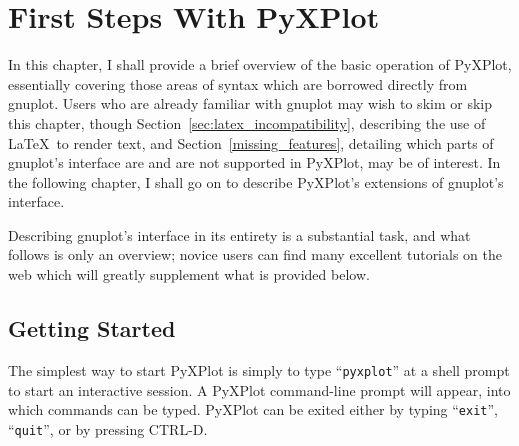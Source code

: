 %
%
%
%
%



\chapter{First Steps With PyXPlot}
\label{gnuplot_intro}

In this chapter, I shall provide a brief overview of the basic operation of
PyXPlot, essentially covering those areas of syntax which are borrowed directly
from gnuplot. Users who are already familiar with gnuplot may wish to skim or
skip this chapter, though Section~\ref{sec:latex_incompatibility}, describing
the use of \LaTeX\ to render text, and Section~\ref{missing_features},
detailing which parts of gnuplot's interface are and are not supported in
PyXPlot, may be of interest. In the following chapter, I shall go on to
describe PyXPlot's extensions of gnuplot's interface.

Describing gnuplot's interface in its entirety is a substantial task, and what
follows is only an overview; novice users can find many excellent tutorials on
the web which will greatly supplement what is provided below.

\section{Getting Started}

The simplest way to start PyXPlot is simply to type ``\texttt{pyxplot}'' at a
shell prompt to start an interactive session. A PyXPlot command-line prompt will
appear, into which commands can be typed. PyXPlot can be exited either by
typing ``\texttt{exit}'', ``\texttt{quit}'', or by pressing CTRL-D.

